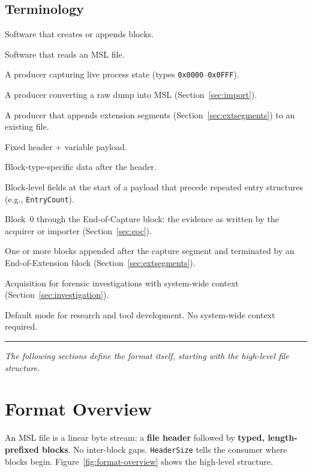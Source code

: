 \documentclass[11pt,a4paper]{article}
\newcommand{\hex}[1]{\texttt{0x#1}}
\newcommand{\field}[1]{\texttt{#1}}
\begin{document}
\subsection{Terminology}
\begin{description}[style=nextline, leftmargin=2em, itemsep=4pt]
\item[Producer] Software that creates or appends blocks.
\item[Consumer] Software that reads an MSL file.
\item[Acquirer] A producer capturing live process state (types \hex{0000}--\hex{0FFF}).
\item[Importer] A producer converting a raw dump into MSL (Section~\ref{sec:import}).
\item[Enrichment tool] A producer that appends extension segments (Section~\ref{sec:extsegments}) to an existing file.
\item[Block] Fixed header + variable payload.
\item[Payload] Block-type-specific data after the header.
\item[Preamble] Block-level fields at the start of a payload that precede repeated entry structures (e.g., \field{EntryCount}).
\item[Capture segment] Block~0 through the End-of-Capture block: the evidence as written by the acquirer or importer (Section~\ref{sec:eoc}).
\item[Extension segment] One or more blocks appended after the capture segment and terminated by an End-of-Extension block (Section~\ref{sec:extsegments}).
\item[Investigation Mode] Acquisition for forensic investigations with system-wide context (Section~\ref{sec:investigation}).
\item[Analysis Mode] Default mode for research and tool development. No system-wide context required.
\end{description}

\vspace{1em}\noindent\rule{\textwidth}{0.3pt}\vspace{0.5em}
\noindent\textit{The following sections define the format itself, starting with the high-level file structure.}

\newpage
\section{Format Overview}\label{sec:overview}
An MSL file is a linear byte stream: a \textbf{file header} followed by \textbf{typed, length-prefixed blocks}. No inter-block gaps. \field{HeaderSize} tells the consumer where blocks begin. Figure~\ref{fig:format-overview} shows the high-level structure.
\end{document}
